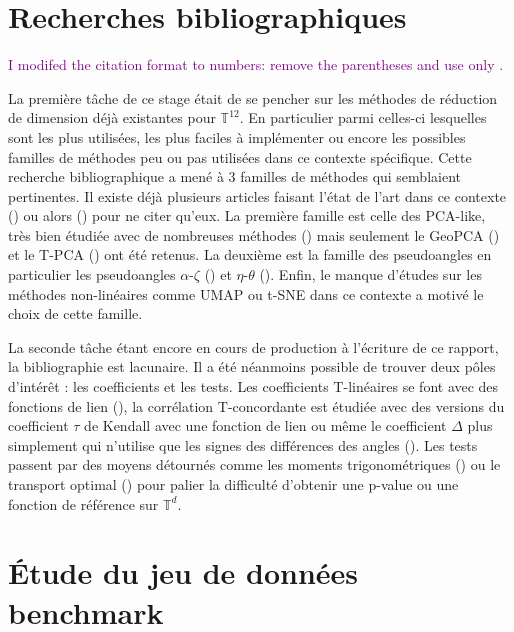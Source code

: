 \documentclass[a4paper,12pt]{article}
\newcommand{\Javier}[1]{\textcolor{purple}{#1}}
\begin{document}
\section{Recherches bibliographiques}

\Javier{I modifed the citation format to numbers: remove the parentheses and use only \cite{sargsyanGeoPCANewTool2012}.}

La première tâche de ce stage était de se pencher sur les méthodes de réduction de dimension déjà existantes pour $\mathbb{T}^{12}$. En particulier parmi celles-ci lesquelles sont les plus utilisées, les plus faciles à implémenter ou encore les possibles familles de méthodes peu ou pas utilisées dans ce contexte spécifique. Cette recherche bibliographique a mené à 3 familles de méthodes qui semblaient pertinentes. Il existe déjà plusieurs articles faisant l'état de l'art dans ce contexte (\cite{nodehiRecentAdvancesPrincipal2026}) ou alors (\cite{pewseyRecentAdvancesDirectional2021}) pour ne citer qu'eux. La première famille est celle des PCA-like, très bien étudiée avec de nombreuses méthodes (\cite{nodehiRecentAdvancesPrincipal2026}) mais seulement le GeoPCA (\cite{sargsyanGeoPCANewTool2012}) et le T-PCA (\cite{eltznerTorusPrincipalComponent2018}) ont été retenus. La deuxième est la famille des pseudoangles en particulier les pseudoangles $\alpha$-$\zeta$ (\cite{eltznerTorusPrincipalComponent2018}) et $\eta$-$\theta$ (\cite{wadleyEvaluatingLearningRNA2007}). Enfin, le manque d'études sur les méthodes non-linéaires comme UMAP ou t-SNE dans ce contexte a motivé le choix de cette famille.

La seconde tâche étant encore en cours de production à l'écriture de ce rapport, la bibliographie est lacunaire. Il a été néanmoins possible de trouver deux pôles d'intérêt : les coefficients et les tests. Les coefficients T-linéaires se font avec des fonctions de lien (\cite{zhanCircularCorrelationData2019}), la corrélation T-concordante est étudiée avec des versions du coefficient $\tau$ de Kendall avec une fonction de lien ou même le coefficient $\Delta$ plus simplement qui n'utilise que les signes des différences des angles (\cite{zhanCircularCorrelationData2019}). Les tests passent par des moyens détournés comme les moments trigonométriques (\cite{garcia-portuguesNonparametricTestsIndependence2021}) ou le transport optimal (\cite{gonzalez-delgadoTwosampleGoodnessoffitTests2023}) pour palier la difficulté d'obtenir une p-value ou une fonction de référence sur $\mathbb{T}^d$.

\section{Étude du jeu de données benchmark}
\end{document}
